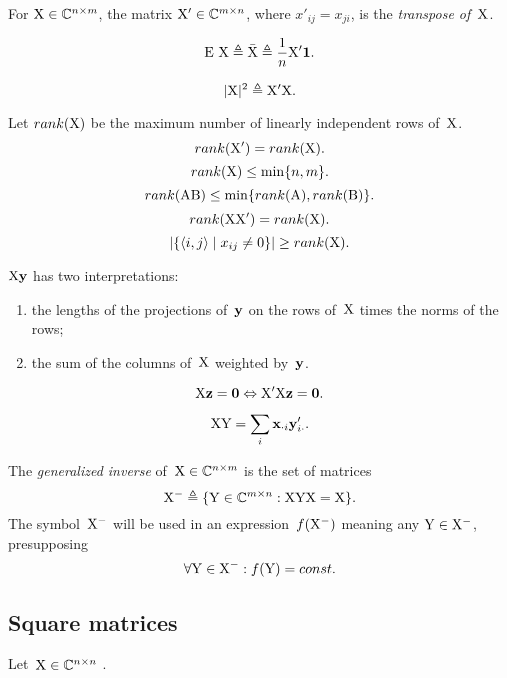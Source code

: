 \documentclass[10pt,a4paper]{article}
\theoremstyle{plain} \newtheorem{Lem}{Lemma}
\begin{document}
For $\mathrm X \in \mathbb C^{n \times m}$, the matrix $\mathrm X' \in \mathbb C^{m \times n}$, where $x'_{ij} = x_{ji}$, is the {\em transpose of~$\mathrm X$}.

$$ \mathrm E \  \mathrm X \triangleq \bar {\mathrm X} \triangleq \frac 1 n \mathrm X' \mathbf 1. $$

$$ |\mathrm X|^2 \triangleq \mathrm X' \mathrm X. $$

Let $rank(\mathrm X)$ be the maximum number of linearly independent rows of~$\mathrm X$.
$$ rank(\mathrm X') = rank(\mathrm X). $$
\comm { \proof {}}
$$ rank(\mathrm X) \le \min \{n, m\}. $$
$$ rank(\mathrm A \mathrm B) \le \min \{rank (\mathrm A), rank (\mathrm B)\}. $$
$$ rank(\mathrm X \mathrm X') = rank (\mathrm X). $$
\begin{equation} \label{rank_nonempty_cells}
  |\{\langle i, j \rangle \mid x_{ij} \ne 0\}| \ge rank(\mathrm X). 
\end{equation}

$\mathrm X \mathbf y$ has two interpretations:
\begin{enumerate} 
  \item the lengths of the projections of~$\mathbf y$ on the rows of~$\mathrm X$ times the norms of the rows;
  \item the sum of the columns of~$\mathrm X$ weighted by~$\mathbf y$.
\end{enumerate}

\begin{equation}\label{sim2dataCentered}
\mathrm X \mathbf z = \mathbf 0 \Leftrightarrow \mathrm X' \mathrm X \mathbf z = \mathbf 0. 
\end{equation}

$$\mathrm X \mathrm Y = \sum_i \mathbf x_{\cdot i} \mathbf y_{i \cdot}'. $$

The {\em generalized inverse} of~$\mathrm X \in \mathbb C^{n \times m}$ is the set of matrices
$$\mathrm X^- \triangleq \{\mathrm Y \in \mathbb C^{m \times n} : \mathrm X \mathrm Y \mathrm X = \mathrm X\}. $$
The symbol~$\mathrm X^-$ will be used in an expression~$f(\mathrm X^-)$ meaning any $\mathrm Y \in \mathrm X^-$, 
presupposing $$\forall \mathrm Y \in \mathrm X^- : f(\mathrm Y) = const. $$



\subsection{Square matrices}

Let~$\mathrm X \in \mathbb C^{n \times n}$ .
\end{document}
